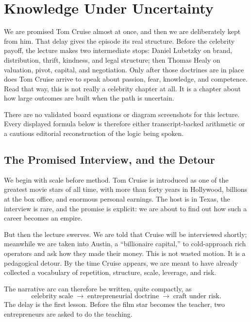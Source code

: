\chapter{Knowledge Under Uncertainty}

We are promised Tom Cruise almost at once, and then we are deliberately kept from him. That delay gives the episode its real structure. Before the celebrity payoff, the lecture makes two intermediate stops: Daniel Lubetzky on brand, distribution, thrift, kindness, and legal structure; then Thomas Healy on valuation, pivot, capital, and negotiation. Only after those doctrines are in place does Tom Cruise arrive to speak about passion, fear, knowledge, and competence. Read that way, this is not really a celebrity chapter at all. It is a chapter about how large outcomes are built when the path is uncertain.

\begin{remark}
There are no validated board equations or diagram screenshots for this lecture. Every displayed formula below is therefore either transcript-backed arithmetic or a cautious editorial reconstruction of the logic being spoken.
\end{remark}

\section{The Promised Interview, and the Detour}

We begin with scale before method. Tom Cruise is introduced as one of the greatest movie stars of all time, with more than forty years in Hollywood, billions at the box office, and enormous personal earnings. The host is in Texas, the interview is rare, and the promise is explicit: we are about to find out how such a career becomes an empire.

But then the lecture swerves. We are told that Cruise will be interviewed shortly; meanwhile we are taken into Austin, a ``billionaire capital,'' to cold-approach rich operators and ask how they made their money. This is not wasted motion. It is a pedagogical detour. By the time Cruise appears, we are meant to have already collected a vocabulary of repetition, structure, scale, leverage, and risk.

The narrative arc can therefore be written, quite compactly, as
\begin{equation}
\text{celebrity scale} \;\longrightarrow\; \text{entrepreneurial doctrine} \;\longrightarrow\; \text{craft under risk}.
\end{equation}
The delay is the first lesson. Before the film star becomes the teacher, two entrepreneurs are asked to do the teaching.

